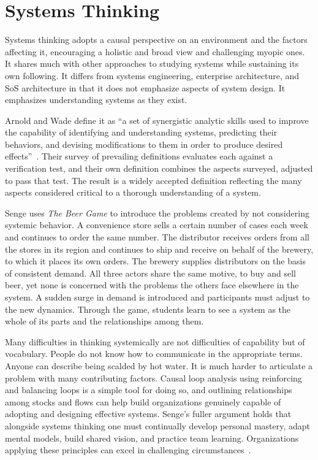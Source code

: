 \documentclass{csimq}
\begin{document}
\section{Systems Thinking}
\label{sec:st}

Systems thinking adopts a causal perspective on an environment and the factors
affecting it, encouraging a holistic and broad view and challenging myopic ones.
It shares much with other approaches to studying systems while sustaining its
own following. It differs from systems engineering, enterprise architecture, and
SoS architecture in that it does not emphasize aspects of system design.
It emphasizes understanding systems as they exist.

Arnold and Wade define it as ``a set of synergistic analytic skills used to
improve the capability of identifying and understanding systems, predicting
their behaviors, and devising modifications to them in order to produce desired
effects''~\cite{arnold2015}. Their survey of prevailing definitions evaluates
each against a verification test, and their own definition combines the
aspects surveyed, adjusted to pass that test. The result is a widely accepted
definition reflecting the many aspects considered critical to a thorough
understanding of a system.

Senge uses \emph{The Beer Game} to introduce the problems created by not
considering systemic behavior. A convenience store sells a certain number of
cases each week and continues to order the same number. The distributor receives
orders from all the stores in its region and continues to ship and receive on
behalf of the brewery, to which it places its own orders. The brewery supplies
distributors on the basis of consistent demand. All three actors share the same
motive, to buy and sell beer, yet none is concerned with the problems the
others face elsewhere in the system. A sudden surge in demand is introduced and
participants must adjust to the new dynamics. Through the game, students learn to
see a system as the whole of its parts and the relationships among them.

Many difficulties in thinking systemically are not difficulties of capability
but of vocabulary. People do not know how to communicate in the appropriate
terms. Anyone can describe being scalded by hot water. It
is much harder to articulate a problem with many contributing factors. Causal
loop analysis using reinforcing and balancing loops is a simple tool for doing
so, and outlining relationships among stocks and flows can help build
organizations genuinely capable of adopting and designing effective systems.
Senge's fuller argument holds that alongside systems thinking one must
continually develop personal mastery, adapt mental models, build shared vision,
and practice team learning. Organizations applying these principles can
excel in challenging circumstances~\cite{senge2018}.
\end{document}
